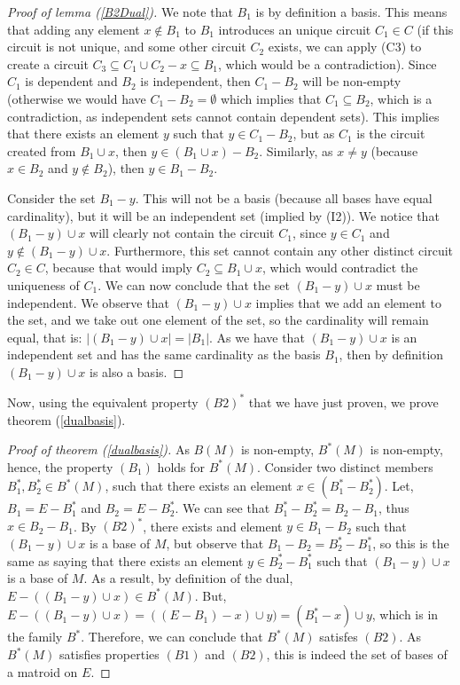 \begin{proof}[Proof of lemma (\ref{B2Dual})]
    We note that $B_1$ is by definition a basis. This means that adding any element $x \not\in B _1 $ to $B _1 $ introduces an unique circuit $C_1 \in C$ (if this circuit is not unique, and some other circuit $C _2 $ exists, we can apply (C3) to create a circuit $C _3 \subseteq C _1 \cup C _2 - x \subseteq B _1$, which would be a contradiction). Since $C_1$ is dependent and $B_2$ is independent, then $C_1 - B_2$ will be non-empty (otherwise we would have $C _1 - B _2 = \emptyset$ which implies that $C _1 \subseteq B _2$, which is a contradiction, as independent sets cannot contain dependent sets). This implies that there exists an element $y$ such that $y \in C_1 - B_2$, but as $C_1$ is the circuit created from $B_1 \cup x$, then $y \in (B_1 \cup x) - B_2$. Similarly, as $x \neq y$ (because $x \in B _2 $ and $y \not\in B _2$), then $y \in B_1 - B_2$. 

    Consider the set $B_1 - y$. This will not be a basis (because all bases have equal cardinality), but it will be an independent set (implied by (I2)). We notice that $(B_1 - y)\cup x$ will clearly not contain the circuit $C_1$, since $y \in C _1 $ and $y \not\in (B _1 - y) \cup x$. Furthermore, this set cannot contain any other distinct circuit $C _2 \in C$, because that would imply $C _2 \subseteq B _1 \cup x$, which would contradict the uniqueness of $C _1 $. We can now conclude that the set $(B_1 - y)\cup x$ must be independent. We observe that $(B_1 - y)\cup x$ implies that we add an element to the set, and we take out one element of the set, so the cardinality will remain equal, that is: $|(B_1 - y)\cup x|=|B_1|$.
As we have that $(B_1 - y)\cup x$ is an independent set and has the same cardinality as the basis $B_1$, then by definition $(B_1 - y)\cup x$ is also a basis. 
\end{proof}

Now, using the equivalent property $(B2)^*$ that we have just proven, we prove theorem (\ref{dualbasis}).
\begin{proof}[Proof of theorem (\ref{dualbasis})]
    As $B(M)$ is non-empty, $B^*(M)$ is non-empty, hence, the property $(B_1)$ holds for $B^*(M)$. 
    Consider two distinct members $B ^* _1 , B ^* _2 \in B^*(M)$, such that there exists an element $x \in (B^*_1 - B^*_2)$. Let, $B_1 = E - B^*_1$ and $B_2 = E - B^*_2$. We can see that $B^*_1 - B^*_2 = B_2 - B_1$, thus $x \in B_2 - B_1$. By ${(B2)}^*$, there exists and element $y \in  B_1 - B_2$ such that $(B_1 - y)\cup x$ is a base of $M$, but observe that $B_1 - B_2 = B^*_2 - B^*_1$, so this is the same as saying that there exists an element $y \in  B^*_2 - B^*_1$ such that $(B_1 - y)\cup x$ is a base of $M$. As a result, by definition of the dual, $E-((B_1 - y)\cup x) \in B^*(M)$. But, $E-((B_1 - y)\cup x) = ((E-B_1)-x)\cup y) = (B_1^* - x)\cup y$, which is in the family $B^*$. Therefore, we can conclude that $B^*(M)$ satisfes $(B2)$. As $B^*(M)$ satisfies  properties $(B1)$ and $(B2)$, this is indeed the set of bases of a matroid on $E$.
\end{proof}

